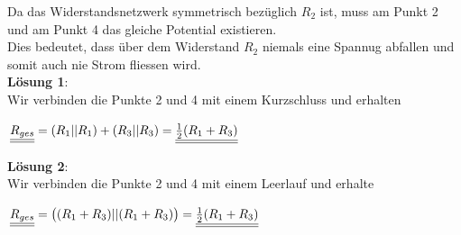 										\beginbsp
										Da das Widerstandsnetzwerk symmetrisch bezüglich $R_2$ ist, muss am Punkt 2 und am Punkt 4 das gleiche Potential existieren. \\
										Dies bedeutet, dass über dem Widerstand $R_2$ niemals eine Spannug abfallen und somit auch nie Strom fliessen wird. \\
										\textbf{Lösung 1}: \\
										Wir verbinden die Punkte 2 und 4 mit einem Kurzschluss und erhalten
										\begin{center}
											$\underline{\underline{R_{ges}}} = (R_1 || R_1) + (R_3 || R_3) = \underline{\underline{\frac{1}{2}(R_1 + R_3)}}$
										\end{center}

										\textbf{Lösung 2}: \\
										Wir verbinden die Punkte 2 und 4 mit einem Leerlauf und erhalte
										\begin{center}
											$\underline{\underline{R_{ges}}} = \big( (R_1 + R_3) || (R_1 + R_3) \big) = \underline{\underline{\frac{1}{2}(R_1 + R_3)}}$
										\end{center}


